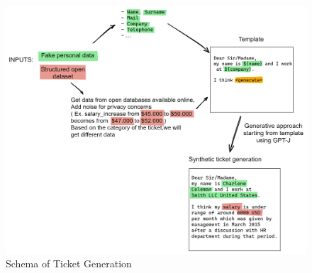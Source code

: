 \begin{figure}[h] 
    \includegraphics[width=\textwidth]{images/ticket_creation_schema.png}
    \caption{Schema of Ticket Generation}
    \label{fig:schema_topic_generation}
\end{figure}    


